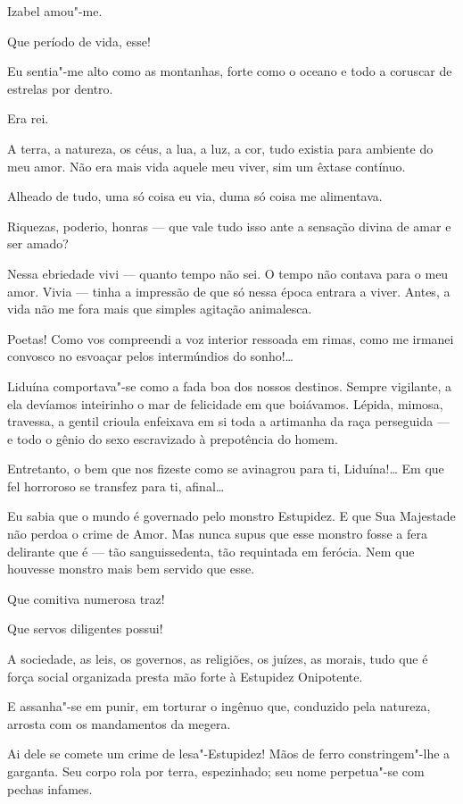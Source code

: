 Izabel amou"-me.

Que período de vida, esse!

Eu sentia"-me alto como as montanhas, forte como o oceano e todo a
coruscar de estrelas por dentro.

Era rei.

A terra, a natureza, os céus, a lua, a luz, a cor, tudo existia para
ambiente do meu amor. Não era mais vida aquele meu viver, sim um êxtase
contínuo.

Alheado de tudo, uma só coisa eu via, duma só coisa me alimentava.

Riquezas, poderio, honras --- que vale tudo isso ante a sensação divina
de amar e ser amado?

Nessa ebriedade vivi --- quanto tempo não sei. O tempo não contava para
o meu amor. Vivia --- tinha a impressão de que só nessa época entrara a
viver. Antes, a vida não me fora mais que simples agitação animalesca.

Poetas! Como vos compreendi a voz interior ressoada em rimas, como me
irmanei convosco no esvoaçar pelos intermúndios do sonho!\ldots{}

Liduína comportava"-se como a fada boa dos nossos destinos. Sempre
vigilante, a ela devíamos inteirinho o mar de felicidade em que
boiávamos. Lépida, mimosa, travessa, a gentil crioula enfeixava em si
toda a artimanha da raça perseguida --- e todo o gênio do sexo
escravizado à prepotência do homem.

Entretanto, o bem que nos fizeste como se avinagrou para ti, Liduína!\ldots{}
Em que fel horroroso se transfez para ti, afinal\ldots{}

Eu sabia que o mundo é governado pelo monstro Estupidez. E que Sua
Majestade não perdoa o crime de Amor. Mas nunca supus que esse monstro
fosse a fera delirante que é --- tão sanguissedenta, tão requintada em
ferócia. Nem que houvesse monstro mais bem servido que esse.

Que comitiva numerosa traz!

Que servos diligentes possui!

A sociedade, as leis, os governos, as religiões, os juízes, as morais,
tudo que é força social organizada presta mão forte à Estupidez
Onipotente.

E assanha"-se em punir, em torturar o ingênuo que, conduzido pela
natureza, arrosta com os mandamentos da megera.

Ai dele se comete um crime de lesa"-Estupidez! Mãos de ferro
constringem"-lhe a garganta. Seu corpo rola por terra, espezinhado; seu
nome perpetua"-se com pechas infames.

